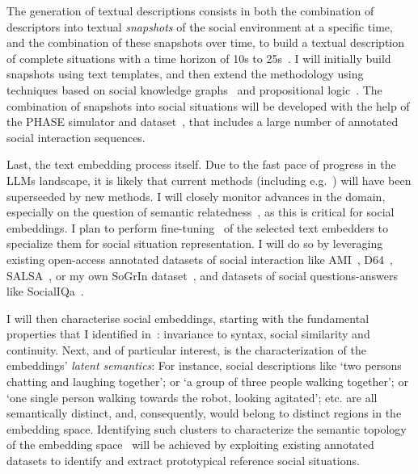 
The generation of textual descriptions consists in both the combination of
descriptors into textual \emph{snapshots} of the social environment at a
specific time, and the combination of these snapshots over time, to build a
textual description of complete situations with a time horizon of 10s to
25s~\cite{netanyahu2021phase}. I will initially build snapshots using text
templates, and then extend the methodology using techniques based on
social knowledge graphs~\cite{sap2019atomic} and propositional
logic~\cite{tsoi2022sean}. The combination of snapshots into social situations
will be developed with the help of the PHASE simulator and
dataset~\cite{netanyahu2021phase}, that includes a large number of annotated
social interaction sequences.

Last, the text embedding process itself. Due to the fast pace of progress in the
LLMs landscape, it is likely that current
methods (including e.g.~\cite{reimers2019sentencebert,muennighoff2022sgpt}) will
have been superseeded by new methods. I will closely monitor
advances in the domain, especially on the question of semantic
relatedness~\cite{thakur2021beir}, as this is critical for social
embeddings. I plan to perform fine-tuning~\cite{hadsell2006dimensionality}
of the selected text embedders to specialize them for social situation
representation. I will do so by leveraging existing open-access annotated
datasets of social interaction like AMI~\cite{carletta2007ami},
D64~\cite{oertel2013d64}, SALSA~\cite{alameda2015salsa}, or my own SoGrIn
dataset~\cite{webb2023sogrin}, and datasets of social questions-answers like
SocialIQa~\cite{sap2019social}.

I will then characterise social embeddings, starting with the fundamental
properties that I identified in~\cite{lemaignan2024social}: invariance to
syntax, social similarity and continuity. Next, and of particular interest, is
the characterization of the embeddings' \emph{latent semantics}: For instance,
social descriptions like `two persons chatting and laughing
together'; or `a group of three people walking together'; or `one single person
walking towards the robot, looking agitated'; etc.  are all semantically
distinct, and, consequently, would belong to distinct regions in the embedding
space. Identifying such clusters to characterize the semantic topology of the
embedding space~\cite{sun2023topological} will be achieved by exploiting
existing annotated datasets to identify and extract prototypical reference social situations.

